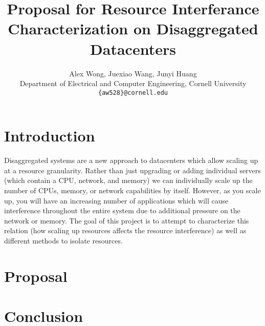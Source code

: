 \documentclass{article}
\title{Proposal for Resource Interferance Characterization on Disaggregated Datacenters}
\author{
    \vspace{6px}
    Alex Wong, Juexiao Wang, Junyi Huang \\
    Department of Electrical and Computer Engineering, Cornell University \\
    \texttt{\{aw528\}@cornell.edu}
}
\let\ACMmaketitle=\maketitle
\renewcommand{\maketitle}{\begingroup\let\footnote=\thanks\ACMmaketitle\endgroup}
\begin{document}
\maketitle

\onehalfspacing

\section{Introduction}
Disaggregated systems are a new approach to datacenters which allow scaling up at a resource granularity. Rather than just upgrading or adding individual servers (which contain a CPU, network, and memory) we can individually scale up the number of CPUs, memory, or network capabilities by itself. However, as you scale up, you will have an increasing number of applications which will cause interference throughout the entire system due to additional pressure on the network or memory. The goal of this project is to attempt to characterize this relation (how scaling up resources affects the resource interference) as well as different methods to isolate resources.

\section{Proposal}

\section{Conclusion}
\end{document}

